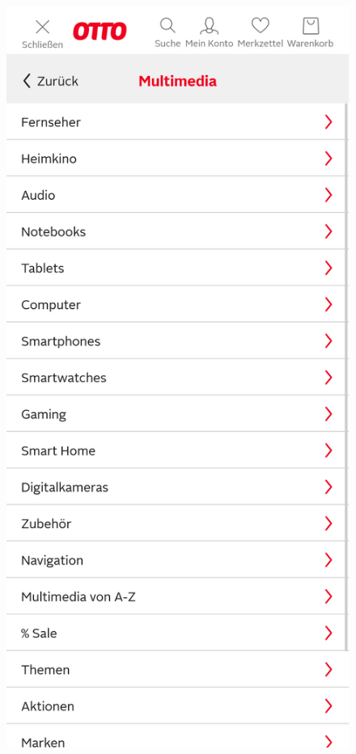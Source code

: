 \begin{figure}[h]
        \includegraphics[scale=0.1]{Bilder/KAtegoorienotto.png}\hspace{1em}

\end{figure}
